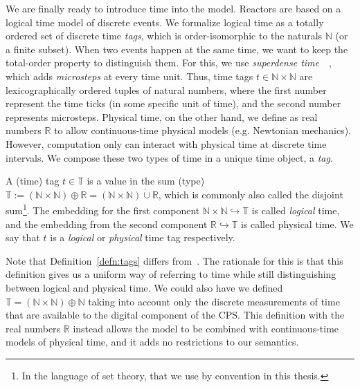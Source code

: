 We are finally ready to introduce time into the model.
Reactors are based on a logical time model of discrete events.
We formalize logical time as a totally ordered set of discrete time \emph{tags}, which is order-isomorphic to the naturals $\mathbb{N}$ (or a finite subset). 
When two events happen at the same time, we want to keep the total-order property to distinguish them.
For this, we use \emph{superdense time}~\cite{superdense,Ptolemaeus:14:SystemDesign}~, which adds \emph{microsteps} at every time unit.
Thus, time tags $t \in \mathbb{N} \times \mathbb{N}$ are lexicographically ordered tuples of natural numbers, where the first number represent the time ticks (in some specific unit of time), and the second number represents microsteps.
Physical time, on the other hand, we define as real numbers $\mathbb{R}$ to allow continuous-time physical models (e.g. Newtonian mechanics).
However, computation only can interact with physical time at discrete time intervals.
We compose these two types of time in a unique time object, a \emph{tag}.

\begin{defn}[tag]
    \label{defn:tags}
   A (time) tag $t \in \mathbb{T}$ is a value in the sum (type) $\mathbb{T} := (\mathbb{N} \times \mathbb{N}) \oplus \mathbb{R} = (\mathbb{N} \times \mathbb{N}) \dot{\cup} \mathbb{R}$, which is commonly also called the disjoint sum\footnote{In the language of set theory, that we use by convention in this thesis.}.
   The embedding for the first component $\mathbb{N} \times \mathbb{N} \hookrightarrow \mathbb{T}$ is called \emph{logical} time, and the embedding from the second component $\mathbb{R} \hookrightarrow \mathbb{T}$ is called physical time.
   We say that $t$ is a \emph{logical} or \emph{physical} time tag respectively.
\end{defn}

Note that Definition~\ref{defn:tags} differs from~\cite{lohstroh_cyphy19,lohstroh_phdthesis}.
The rationale for this is that this definition gives us a uniform way of referring to time while still distinguishing between logical and physical time.
We could also have we defined $\mathbb{T} = (\mathbb{N} \times \mathbb{N}) \oplus \mathbb{N}$ taking into account only the discrete measurements of time that are available to the digital component of the \ac{CPS}.
This definition with the real numbers $\mathbb{R}$ instead allows the model to be combined with continuous-time models of physical time, and it adds no restrictions to our semantics.

